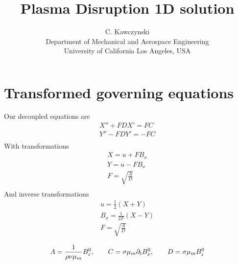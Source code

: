 \documentclass[11pt]{article}
\begin{document}
\doublespacing
\title{Plasma Disruption 1D solution}
\author{C. Kawczynski \\
Department of Mechanical and Aerospace Engineering \\
University of California Los Angeles, USA\\
}
\maketitle

\section{Transformed governing equations}
Our decoupled equations are
\begin{equation}\begin{aligned}
X'' + F D X' =   FC \\
Y'' - F D Y' = - FC \\
\end{aligned} \end{equation}
With transformations
\begin{equation}\begin{aligned}
X = u + F B_x \\
Y = u - F B_x \\
F = \sqrt{\frac{A}{D}} \\
\end{aligned} \end{equation}
And inverse transformations
\begin{equation}\begin{aligned}
u   = \frac{1}{2} \left( X + Y \right) \\
B_x = \frac{1}{2F} \left( X - Y \right) \\
F = \sqrt{\frac{A}{D}} \\
\end{aligned} \end{equation}
\begin{equation}\begin{aligned}
A = \frac{1}{\rho \nu {\mu_m}} B_z^0, \qquad
C = \sigma {\mu_m} \partial_t B_x^0, \qquad
D = \sigma {\mu_m} B_z^0
\end{aligned} \end{equation}
\end{document}
